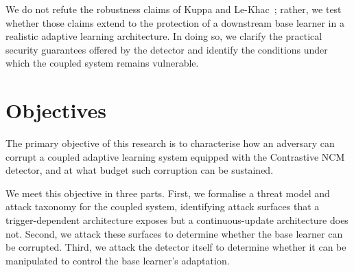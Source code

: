 We do not refute the robustness claims of Kuppa and Le-Khac~\cite{Kuppa_2022}; rather, we test whether those claims extend to the protection of a downstream base learner in a realistic adaptive learning architecture. In doing so, we clarify the practical security guarantees offered by the detector and identify the conditions under which the coupled system remains vulnerable.

\section{Objectives}
The primary objective of this research is to characterise how an adversary can corrupt a coupled adaptive learning system equipped with the Contrastive NCM detector, and at what budget such corruption can be sustained.

We meet this objective in three parts. First, we formalise a threat model and attack taxonomy for the coupled system, identifying attack surfaces that a trigger-dependent architecture exposes but a continuous-update architecture does not. Second, we attack these surfaces to determine whether the base learner can be corrupted. Third, we attack the detector itself to determine whether it can be manipulated to control the base learner's adaptation.




